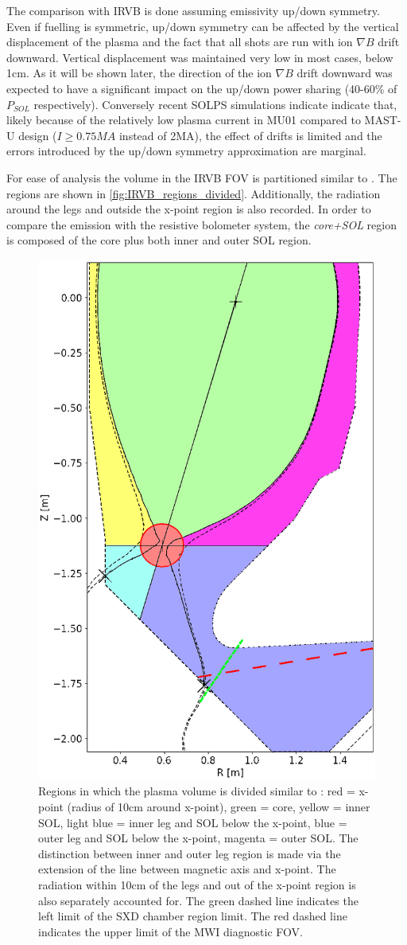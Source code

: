 The comparison with IRVB is done assuming emissivity up/down symmetry. Even if fuelling is symmetric, up/down symmetry can be affected by the vertical displacement of the plasma and the fact that all shots are run with ion $\nabla B$ drift downward. Vertical displacement was maintained very low in most cases, below 1cm. As it will be shown later, the direction of the ion $\nabla B$ drift downward was expected to have a significant impact on the up/down power sharing (40-60\% of $P_{SOL}$ respectively).\cite{Fevrier2021} Conversely recent SOLPS simulations indicate indicate that, likely because of the relatively low plasma current in MU01 compared to MAST-U design ($I\geq 0.75MA$ instead of 2MA), the effect of drifts is limited and the errors introduced by the up/down symmetry approximation are marginal.

For ease of analysis the volume in the IRVB FOV is partitioned similar to \cite{Harrison2017}. The regions are shown in \autoref{fig:IRVB_regions_divided}. Additionally, the radiation around the legs and outside the x-point region is also recorded. In order to compare the emission with the resistive bolometer system, the \emph{core+SOL} region is composed of the core plus both inner and outer SOL region.

\begin{figure}[!ht]
	\centering
	\includegraphics[trim={0 0 0 0},clip,width=0.4\linewidth]{Chapters/chapter2/figs/IRVB_regions_divided2.png}
	\caption{Regions in which the plasma volume is divided similar to \cite{Harrison2011}: red = x-point (radius of 10cm around x-point), green = core, yellow = inner SOL, light blue = inner leg and SOL below the x-point, blue = outer leg and SOL below the x-point, magenta = outer SOL. The distinction between inner and outer leg region is made via the extension of the line between magnetic axis and x-point. The radiation within 10cm of the legs and out of the x-point region is also separately accounted for. The green dashed line indicates the left limit of the SXD chamber region limit. The red dashed line indicates the upper limit of the MWI diagnostic FOV.}
	\label{fig:IRVB_regions_divided}
\end{figure}


